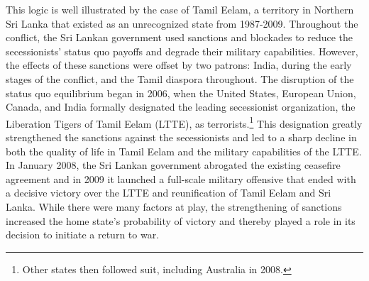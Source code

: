 \documentclass[11pt,letterpaper, notitlepage]{article}
\begin{document}
This logic is well illustrated by the case of Tamil Eelam, a territory in Northern Sri Lanka that existed as an unrecognized state from 1987-2009. Throughout the conflict, the Sri Lankan government used sanctions and blockades to reduce the secessionists' status quo payoffs and degrade their military capabilities. However, the effects of these sanctions were offset by two patrons: India, during the early stages of the conflict, and the Tamil diaspora throughout. The disruption of the status quo equilibrium began in 2006, when the United States, European Union, Canada, and India formally designated the leading secessionist organization, the Liberation Tigers of Tamil Eelam (LTTE), as terrorists.\footnote{Other states then followed suit, including Australia in 2008.} This designation greatly strengthened the sanctions against the secessionists and led to a sharp decline in both the quality of life in Tamil Eelam and the military capabilities of the LTTE. In January 2008, the Sri Lankan government abrogated the existing ceasefire agreement and in 2009 it launched a full-scale military offensive that ended with a decisive victory over the LTTE and reunification of Tamil Eelam and Sri Lanka. While there were many factors at play, the strengthening of sanctions increased the home state's probability of victory and thereby played a role in its decision to initiate a return to war.



\end{document}
